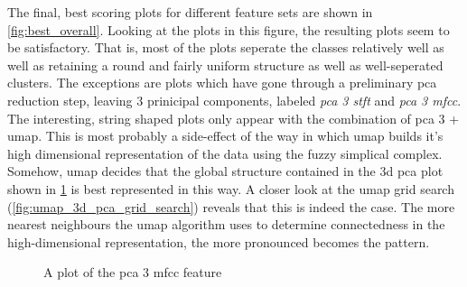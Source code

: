 \documentclass[11pt]{article}
\begin{document}
The final, best scoring plots for different feature sets are shown in \ref{fig:best_overall}. Looking at the plots in this figure, the resulting plots seem to be satisfactory. That is, most of the plots seperate the classes relatively well as well as retaining a round and fairly uniform structure as well as well-seperated clusters. The exceptions are plots which have gone through a preliminary pca reduction step, leaving 3 prinicipal components, labeled \textit{pca 3 stft} and \textit{pca 3 mfcc}. The interesting, string shaped plots only appear with the combination of pca 3 + umap. This is most probably a side-effect of the way in which umap builds it's high dimensional representation of the data using the fuzzy simplical complex. Somehow, umap decides that the global structure contained in the 3d pca plot shown in \ref{fig:3d_pca} is best represented in this way. A closer look at the umap grid search (\ref{fig:umap_3d_pca_grid_search}) reveals that this is indeed the case. The more nearest neighbours the umap algorithm uses to determine connectedness in the high-dimensional representation, the more pronounced becomes the pattern.


\begin{figure}[hb]
\centering
{}
\caption{\label{fig:3d_pca}A plot of the pca 3 mfcc feature}
\end{figure}
\end{document}
